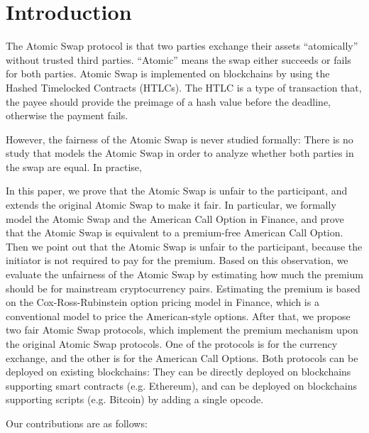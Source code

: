 \section{Introduction}
\label{sec:intro}

The Atomic Swap protocol is that two parties exchange their assets ``atomically'' without trusted third parties.
``Atomic'' means the swap either succeeds or fails for both parties.
Atomic Swap is implemented on blockchains by using the Hashed Timelocked Contracts (HTLCs).
The HTLC is a type of transaction that, the payee should provide the preimage of a hash value before the deadline, otherwise the payment fails.

However, the fairness of the Atomic Swap is never studied formally:
There is no study that models the Atomic Swap in order to analyze whether both parties in the swap are equal.
In practise, %

In this paper, we prove that the Atomic Swap is unfair to the participant, and extends the original Atomic Swap to make it fair.
In particular, we formally model the Atomic Swap and the American Call Option in Finance,
and prove that the Atomic Swap is equivalent to a premium-free American Call Option.
Then we point out that the Atomic Swap is unfair to the participant, because the initiator is not required to pay for the premium.
Based on this observation, we evaluate the unfairness of the Atomic Swap by estimating how much the premium should be for mainstream cryptocurrency pairs.
Estimating the premium is based on the Cox-Ross-Rubinstein option pricing model in Finance, which is a conventional model to price the American-style options.
After that, we propose two fair Atomic Swap protocols, which implement the premium mechanism upon the original Atomic Swap protocols.
One of the protocols is for the currency exchange, and the other is for the American Call Options.
Both protocols can be deployed on existing blockchains:
They can be directly deployed on blockchains supporting smart contracts (e.g. Ethereum),
and can be deployed on blockchains supporting scripts (e.g. Bitcoin) by adding a single opcode.

Our contributions are as follows:

